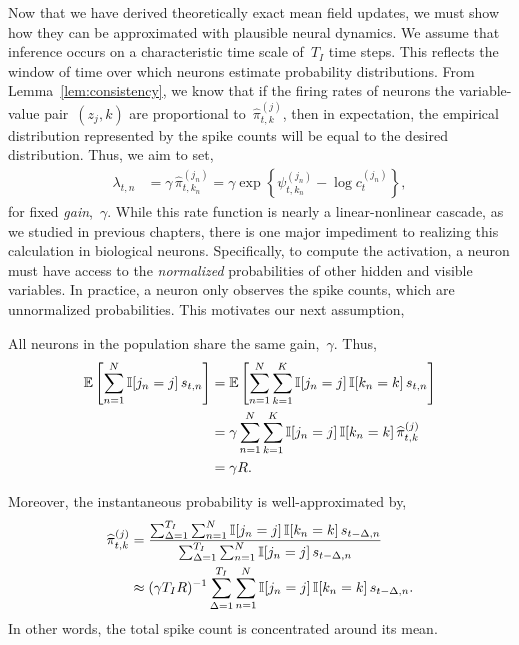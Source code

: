 Now that we have derived theoretically exact mean field updates, we
must show how they can be approximated with plausible neural dynamics.
We assume that inference occurs on a characteristic time scale of~$T_I$
time steps. This reflects the window of time over which neurons estimate
probability distributions.
From Lemma~\ref{lem:consistency}, we know that if the firing rates of
neurons the variable-value pair~${(z_j,k)}$ are proportional
to~$\widehat{\pi}_{t,k}^{(j)}$, then in expectation, the empirical
distribution represented by the spike counts will be equal to the
desired distribution. Thus, we aim to set,
\begin{align}
  \lambda_{t,n} &= \gamma \, \widehat{\pi}_{t,k_n}^{(j_n)}
  = \gamma \exp \left \{\psi_{t,k_n}^{(j_n)} -\log c_{t}^{(j_n)} \right \},
\end{align}
for fixed \emph{gain},~$\gamma$. While this rate function is
nearly a linear-nonlinear cascade, as we studied in previous
chapters, there is one major impediment to realizing this
calculation in biological neurons. Specifically, to compute
the activation, a neuron must have access to the \emph{normalized}
probabilities of other hidden and visible variables. In practice,
a neuron only observes the spike counts, which are
unnormalized probabilities. This motivates our next assumption,

\begin{assumption}
  All neurons in the population share the same gain,~$\gamma$.
  Thus,
  \begin{align}
    \mathbb{E} \left[ \sum_{n=1}^N \mathbb{I}[j_n=j] \, s_{t,n} \right]
    &= \mathbb{E} \left[ \sum_{n=1}^N \sum_{k=1}^K \mathbb{I}[j_n=j] \, \mathbb{I}[k_n=k] \,s_{t,n} \right] \\
    &= \gamma \sum_{n=1}^N \sum_{k=1}^K \mathbb{I}[j_n=j] \, \mathbb{I}[k_n=k] \, \widehat{\pi}_{t,k}^{(j)} \\
    &= \gamma R.
  \end{align}

  Moreover, the instantaneous probability is well-approximated by,
  \begin{align}
      \widehat{\pi}_{t,k}^{(j)} &=
  \frac{\sum_{\Delta=1}^{T_I} \sum_{n=1}^N \mathbb{I}[j_n=j] \, \mathbb{I}[k_n=k] \, s_{t-\Delta ,n}}
       {\sum_{\Delta=1}^{T_I} \sum_{n=1}^N \mathbb{I}[j_n=j] \, s_{t-\Delta ,n}} \\
       &\approx (\gamma T_I R)^{-1} \sum_{\Delta=1}^{T_I} \sum_{n=1}^N \mathbb{I}[j_n=j] \, \mathbb{I}[k_n=k] \, s_{t-\Delta,n}.
  \end{align}
  In other words, the total spike count is concentrated around its mean.
\end{assumption}

